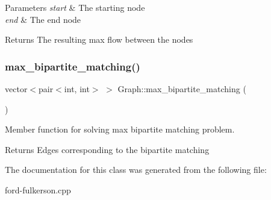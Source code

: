 \begin{DoxyParams}{Parameters}
{\em start} & The starting node \\
\hline
{\em end} & The end node \\
\hline
\end{DoxyParams}
\begin{DoxyReturn}{Returns}
The resulting max flow between the nodes 
\end{DoxyReturn}
\mbox{\label{classGraph_a88a8eca3d603c4b20b848f20e70a9b36}} 
\subsubsection{\texorpdfstring{max\+\_\+bipartite\+\_\+matching()}{max\_bipartite\_matching()}}
{\footnotesize\ttfamily vector$<$pair$<$int, int$>$ $>$ Graph\+::max\+\_\+bipartite\+\_\+matching (\begin{DoxyParamCaption}{ }\end{DoxyParamCaption})\hspace{0.3cm}{\ttfamily [inline]}}



Member function for solving max bipartite matching problem. 

\begin{DoxyReturn}{Returns}
Edges corresponding to the bipartite matching 
\end{DoxyReturn}


The documentation for this class was generated from the following file\+:\begin{DoxyCompactItemize}
\item 
ford-\/fulkerson.\+cpp\end{DoxyCompactItemize}
